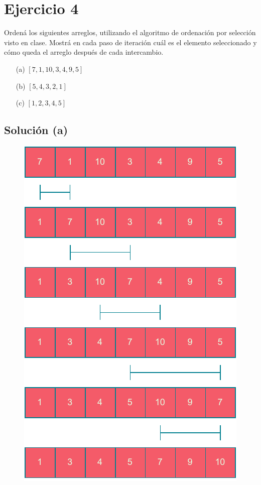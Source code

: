 \section{Ejercicio 4}

Ordená los siguientes arreglos, utilizando el algoritmo de ordenación por selección visto en clase. Mostrá en cada paso de iteración cuál es el elemento seleccionado y cómo queda el arreglo después de cada intercambio.

\begin{itemize}
    \item[(a)] $[7, 1, 10, 3, 4, 9, 5]$
    \item[(b)] $[5, 4, 3, 2, 1]$
    \item[(c)] $[1, 2, 3, 4, 5]$
\end{itemize}

\subsection{Solución (a)}
\begin{figure}[h]
    \centering
    \includegraphics[scale=0.6]{./estáticos/4a.pdf}
\end{figure}


